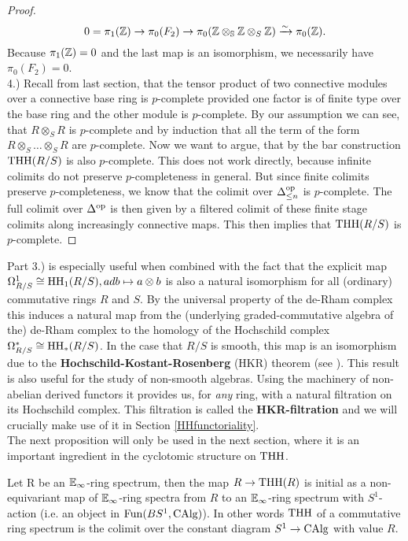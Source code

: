 \begin{proof}
    \begin{equation*}
        0=\pi_1(\mathbb{Z})\to \pi_0(F_2)\to \pi_0(\mathbb{Z}\otimes_{\mathbb{S}}\mathbb{Z}\otimes_S\mathbb{Z})\xrightarrow{\sim} \pi_0(\mathbb{Z}).
    \end{equation*}
    Because $\pi_1(\mathbb{Z})=0$ and the last map is an isomorphism, we necessarily have $\pi_0(F_2)=0$. \\
    4.) Recall from last section, that the tensor product of two connective modules over a connective base ring is $p$-complete provided one factor is of finite type over the base ring and the other module is $p$-complete. By our assumption we can see, that $R\otimes_S R$ is $p$-complete and by induction that all the term of the form $R\otimes_S \dots \otimes_S R$ are $p$-complete. Now we want to argue, that by the bar construction $\operatorname{THH}(R/S)$ is also $p$-complete. This does not work directly, because infinite colimits do not preserve $p$-completeness in general. But since finite colimits preserve $p$-completeness, we know that the colimit over $\Delta^{\operatorname{op}}_{\leq n}$ is $p$-complete. The full colimit over $\Delta^{\operatorname{op}}$ is then given by a filtered colimit of these finite stage colimits along increasingly connective maps. This then implies that $\operatorname{THH}(R/S)$ is $p$-complete.
\end{proof}
Part 3.) is especially useful when combined with the fact that the explicit map $\Omega^1_{R/S} \cong \operatorname{HH}_1(R/S), adb\mapsto a\otimes b$ is also a natural isomorphism for all (ordinary) commutative rings $R$ and $S$. By the universal property of the de-Rham complex this induces a natural map from the (underlying graded-commutative algebra of the) de-Rham complex to the homology of the Hochschild complex $\Omega^{*}_{R/S} \cong \operatorname{HH}_*(R/S)$. 
In the case that $R/S$ is smooth, this map is an isomorphism due to the \textbf{Hochschild-Kostant-Rosenberg} (HKR) theorem (see \cite[Section~3.4]{loday2013cyclic}). 
This result is also useful for the study of non-smooth algebras. Using the machinery of non-abelian derived functors it provides us, for \textit{any} ring, with a natural filtration on its Hochschild complex. This filtration is called the \textbf{HKR-filtration} and we will crucially make use of it in Section \ref{HHfunctoriality}.
\\
The next proposition will only be used in the next section, where it is an important ingredient in the cyclotomic structure on $\operatorname{THH}$.
\begin{prop}\cite{mcclureschwaenzlvogt}
\label{McClureSchwaenzlVogt}
Let R be an $\mathbb{E}_\infty$-ring spectrum, then the map $R\rightarrow \operatorname{THH}(R)$ is initial as a non-equivariant map of $\mathbb{E}_\infty$-ring spectra from $R$ to an $\mathbb{E}_\infty$-ring spectrum with $S^1$-action (i.e. an object in $\operatorname{Fun}(BS^1,\operatorname{CAlg})$). In other words $\operatorname{THH}$ of a commutative ring spectrum is the colimit over the constant diagram $S^1\rightarrow \operatorname{CAlg}$ with value $R$.
\end{prop}
